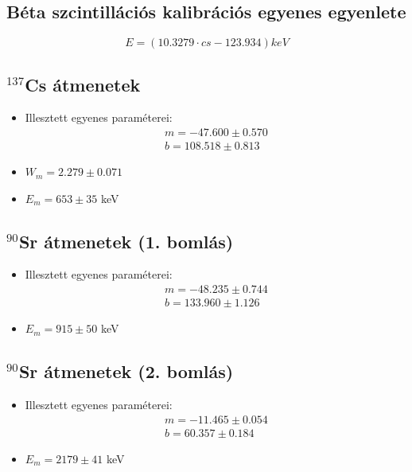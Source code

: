 \documentclass[12pt,a4paper]{article}
\begin{document}
\subsection{Béta szcintillációs kalibrációs egyenes egyenlete}
\begin{equation*}
E=(10.3279\cdot cs -123.934) keV
\end{equation*}
\subsection{$^{137}$Cs átmenetek}
\begin{itemize}
\item{Illesztett egyenes paraméterei:
\begin{equation*}
\begin{split}
m=-47.600\pm 0.570\\
b=108.518 \pm 0.813
\end{split}
\end{equation*}
}
\item{$W_m=2.279\pm0.071$}
\item{$E_m=653\pm 35$ keV}
\end{itemize}
\subsection{$^{90}$Sr átmenetek (1. bomlás)}
\begin{itemize}
\item{Illesztett egyenes paraméterei:
\begin{equation*}
\begin{split}
m=-48.235\pm 0.744\\
b=133.960 \pm 1.126
\end{split}
\end{equation*}
}
\item{$E_m=915\pm 50$ keV}
\end{itemize}
\subsection{$^{90}$Sr átmenetek (2. bomlás)}
\begin{itemize}
\item{Illesztett egyenes paraméterei:
\begin{equation*}
\begin{split}
m=-11.465\pm 0.054\\
b=60.357 \pm 0.184
\end{split}
\end{equation*}
}
\item{$E_m=2179\pm 41$ keV}
\end{itemize}
\end{document}
